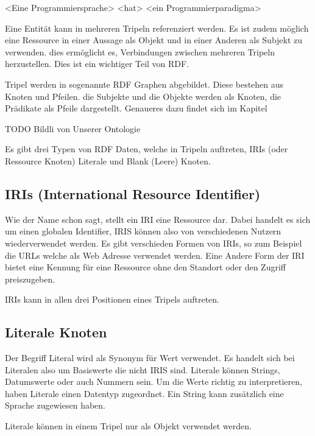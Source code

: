 \noindent\hspace*{15mm} <Eine Programmiersprache> <hat> <ein Programmierparadigma>


Eine Entität kann in mehreren Tripeln referenziert werden. Es ist zudem möglich eine Ressource in einer Aussage als Objekt und in einer Anderen als Subjekt zu verwenden. dies ermöglicht es, Verbindungen zwischen mehreren Tripeln herzustellen. Dies ist ein wichtiger Teil von RDF.

Tripel werden in sogenannte RDF Graphen abgebildet. Diese bestehen aus Knoten und Pfeilen. die Subjekte und die Objekte werden als Knoten, die Prädikate als Pfeile dargestellt. Genaueres dazu findet sich im Kapitel 



TODO Bildli von Unserer Ontologie

Es gibt drei Typen von RDF Daten, welche in Tripeln auftreten, IRIs (oder Ressource Knoten) Literale und Blank (Leere) Knoten.

\subsection{IRIs (International Resource Identifier)}
\label{sec:rdf_rdf_dataModel_iris}
Wie der Name schon sagt, stellt ein IRI  eine Ressource dar. Dabei handelt es sich um einen globalen Identifier, IRIS können also von verschiedenen Nutzern wiederverwendet werden. Es gibt verschieden Formen von IRIs, so zum Beispiel die URLs welche als Web Adresse verwendet werden. Eine Andere Form der IRI bietet eine Kennung für eine Ressource ohne den Standort oder den Zugriff preiszugeben.%

\noindent\hspace*{15mm}IRIs kann in allen drei Positionen eines Tripels auftreten.

\subsection{Literale Knoten}
\label{sec:rdf_rdf_dataModel_literal}
Der Begriff Literal wird als Synonym für Wert verwendet. Es handelt sich bei Literalen also um Basiswerte die nicht IRIS sind. Literale können Strings, Datumswerte oder auch Nummern sein. Um die Werte richtig zu interpretieren, haben Literale einen Datentyp zugeordnet. Ein String kann zusätzlich eine Sprache zugewiesen haben.

Literale können in einem Tripel nur als Objekt verwendet werden.

